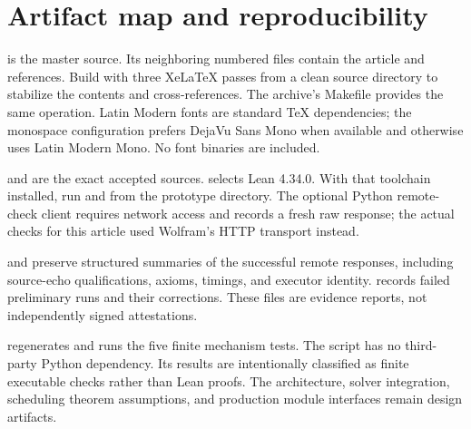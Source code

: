 \clearpage
\section{Artifact map and reproducibility}
 is the master source. Its neighboring numbered  files contain the article and references. Build with three XeLaTeX passes from a clean source directory to stabilize the contents and cross-references. The archive's Makefile provides the same operation. Latin Modern fonts are standard TeX dependencies; the monospace configuration prefers DejaVu Sans Mono when available and otherwise uses Latin Modern Mono. No font binaries are included.

 and  are the exact accepted sources.  selects Lean 4.34.0. With that toolchain installed, run  and  from the prototype directory. The optional Python remote-check client requires network access and records a fresh raw response; the actual checks for this article used Wolfram's HTTP transport instead.

 and  preserve structured summaries of the successful remote responses, including source-echo qualifications, axioms, timings, and executor identity.  records failed preliminary runs and their corrections. These files are evidence reports, not independently signed attestations.

 regenerates  and runs the five finite mechanism tests. The script has no third-party Python dependency. Its results are intentionally classified as finite executable checks rather than Lean proofs. The architecture, solver integration, scheduling theorem assumptions, and production module interfaces remain design artifacts.
